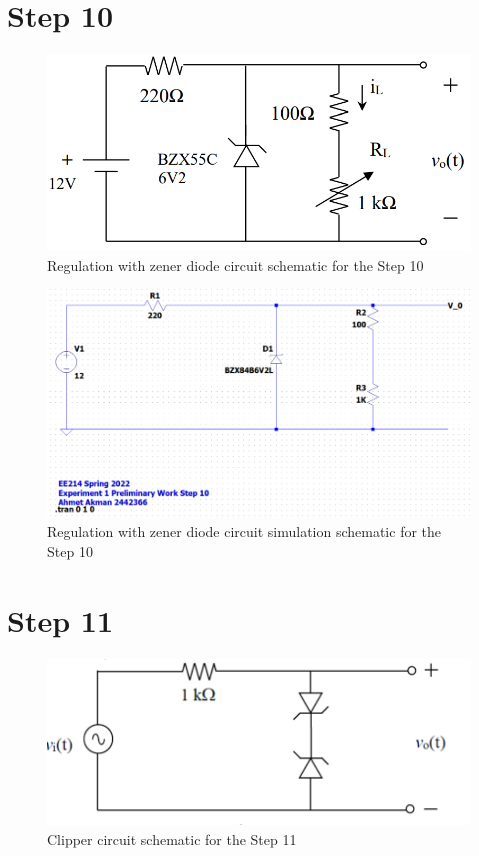 \documentclass[letterpaper,12pt]{article}
\begin{document}
\section{Step 10}
\begin{figure}[H]
    \centering
   \includegraphics[width=1\textwidth]{10_1.png}
   \caption{Regulation with zener diode circuit schematic for the Step 10}
\end{figure} 

\begin{figure}[H]
    \centering
   \includegraphics[width=1\textwidth]{10SCH.png}
   \caption{Regulation with zener diode circuit simulation schematic for the Step 10}
\end{figure} 


\section{Step 11}
\begin{figure}[H]
    \centering
   \includegraphics[width=1\textwidth]{11_1.png}
   \caption{Clipper circuit schematic for the Step 11}
\end{figure} 
\end{document}
